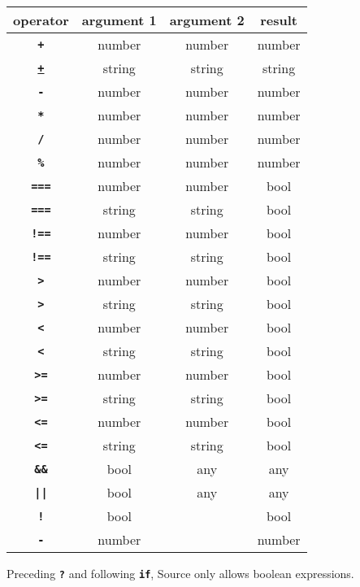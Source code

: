 \begin{center}
\begin{tabular}{c|c|c|c}
operator & argument 1 & argument 2 & result\\ \hline
\texttt{\textbf{+}} & number   & number     & number\\
\texttt{\href{https://source-academy.github.io/sicp/chapters/3.3.4.html\#p24}{\textbf{+}}} & string   & string     & string\\
\texttt{\textbf{-}} & number   & number     & number\\
\texttt{\textbf{*}} & number   & number     & number\\
\texttt{\textbf{/}} & number   & number     & number\\
\texttt{\textbf{\%}} & number   & number     & number\\
\texttt{\textbf{===}} & number   & number     & bool\\
\texttt{\textbf{===}} & string   & string     & bool\\
\texttt{\textbf{!==}} & number   & number     & bool\\
\texttt{\textbf{!==}} & string   & string     & bool\\
\texttt{\textbf{>}} & number   & number     & bool\\
\texttt{\textbf{>}} & string   & string     & bool\\
\texttt{\textbf{<}} & number   & number     & bool\\
\texttt{\textbf{<}} & string   & string     & bool\\
\texttt{\textbf{>=}} & number   & number     & bool\\
\texttt{\textbf{>=}} & string   & string     & bool\\
\texttt{\textbf{<=}}    & number   & number     & bool\\
\texttt{\textbf{<=}} & string   & string     & bool\\
\texttt{\textbf{\&\&}} & bool & any & any\\
\texttt{\textbf{||}}   & bool & any & any\\
\texttt{\textbf{!}}    & bool &      & bool\\
\texttt{\textbf{-}}    & number &    & number
\end{tabular}
\end{center}

Preceding \texttt{\textbf{?}} and following \texttt{\textbf{if}}, Source only allows
boolean expressions.
